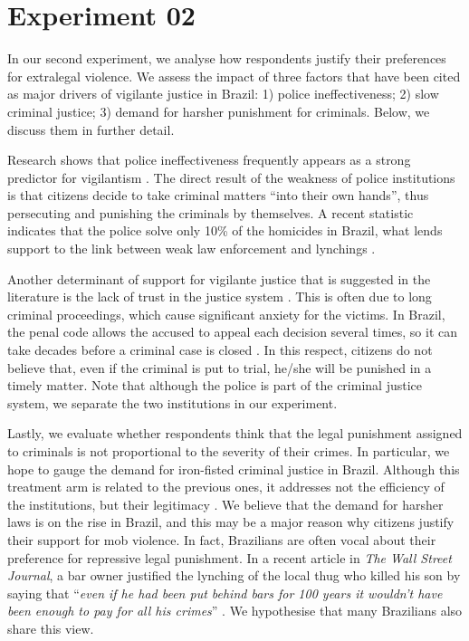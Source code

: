 \documentclass[12pt,a4paper,]{article}
\begin{document}
\hypertarget{experiment-02}{%
\section{Experiment 02}\label{experiment-02}}

In our second experiment, we analyse how respondents justify their
preferences for extralegal violence. We assess the impact of three
factors that have been cited as major drivers of vigilante justice in
Brazil: 1) police ineffectiveness; 2) slow criminal justice; 3) demand
for harsher punishment for criminals. Below, we discuss them in further
detail.

Research shows that police ineffectiveness frequently appears as a
strong predictor for vigilantism
\citep{cruz2019determinants, garcia2019anger}. The direct result of the
weakness of police institutions is that citizens decide to take criminal
matters ``into their own hands'', thus persecuting and punishing the
criminals by themselves. A recent statistic indicates that the police
solve only 10\% of the homicides in Brazil, what lends support to the
link between weak law enforcement and lynchings
\citep{pearson2018latam}.

Another determinant of support for vigilante justice that is suggested
in the literature is the lack of trust in the justice system
\citep{godoy2004justice, smith2019contradictions}. This is often due to
long criminal proceedings, which cause significant anxiety for the
victims. In Brazil, the penal code allows the accused to appeal each
decision several times, so it can take decades before a criminal case is
closed \citep{sousa2005utilizaccao}. In this respect, citizens do not
believe that, even if the criminal is put to trial, he/she will be
punished in a timely matter. Note that although the police is part of
the criminal justice system, we separate the two institutions in our
experiment.

Lastly, we evaluate whether respondents think that the legal punishment
assigned to criminals is not proportional to the severity of their
crimes. In particular, we hope to gauge the demand for iron-fisted
criminal justice in Brazil. Although this treatment arm is related to
the previous ones, it addresses not the efficiency of the institutions,
but their legitimacy \citep{nivette2016institutional}. We believe that
the demand for harsher laws is on the rise in Brazil, and this may be a
major reason why citizens justify their support for mob violence. In
fact, Brazilians are often vocal about their preference for repressive
legal punishment. In a recent article in \emph{The Wall Street Journal},
a bar owner justified the lynching of the local thug who killed his son
by saying that ``\emph{even if he had been put behind bars for 100 years
it wouldn't have been enough to pay for all his crimes}''
\citep{pearson2018latam}. We hypothesise that many Brazilians also share
this view.
\end{document}
